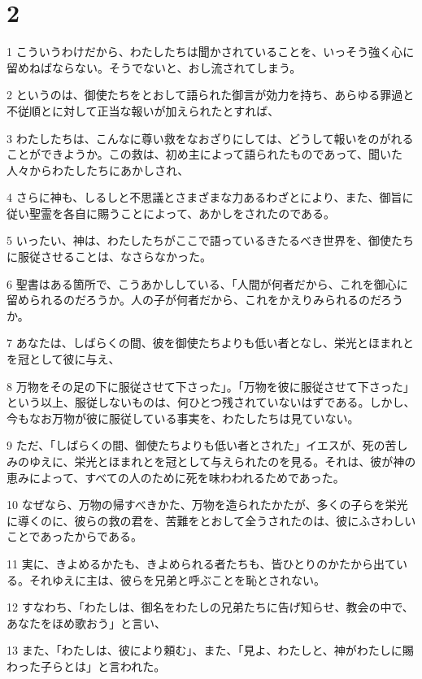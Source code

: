 \chapter{2}

\par 1 こういうわけだから、わたしたちは聞かされていることを、いっそう強く心に留めねばならない。そうでないと、おし流されてしまう。
\par 2 というのは、御使たちをとおして語られた御言が効力を持ち、あらゆる罪過と不従順とに対して正当な報いが加えられたとすれば、
\par 3 わたしたちは、こんなに尊い救をなおざりにしては、どうして報いをのがれることができようか。この救は、初め主によって語られたものであって、聞いた人々からわたしたちにあかしされ、
\par 4 さらに神も、しるしと不思議とさまざまな力あるわざとにより、また、御旨に従い聖霊を各自に賜うことによって、あかしをされたのである。
\par 5 いったい、神は、わたしたちがここで語っているきたるべき世界を、御使たちに服従させることは、なさらなかった。
\par 6 聖書はある箇所で、こうあかししている、「人間が何者だから、これを御心に留められるのだろうか。人の子が何者だから、これをかえりみられるのだろうか。
\par 7 あなたは、しばらくの間、彼を御使たちよりも低い者となし、栄光とほまれとを冠として彼に与え、
\par 8 万物をその足の下に服従させて下さった」。「万物を彼に服従させて下さった」という以上、服従しないものは、何ひとつ残されていないはずである。しかし、今もなお万物が彼に服従している事実を、わたしたちは見ていない。
\par 9 ただ、「しばらくの間、御使たちよりも低い者とされた」イエスが、死の苦しみのゆえに、栄光とほまれとを冠として与えられたのを見る。それは、彼が神の恵みによって、すべての人のために死を味わわれるためであった。
\par 10 なぜなら、万物の帰すべきかた、万物を造られたかたが、多くの子らを栄光に導くのに、彼らの救の君を、苦難をとおして全うされたのは、彼にふさわしいことであったからである。
\par 11 実に、きよめるかたも、きよめられる者たちも、皆ひとりのかたから出ている。それゆえに主は、彼らを兄弟と呼ぶことを恥とされない。
\par 12 すなわち、「わたしは、御名をわたしの兄弟たちに告げ知らせ、教会の中で、あなたをほめ歌おう」と言い、
\par 13 また、「わたしは、彼により頼む」、また、「見よ、わたしと、神がわたしに賜わった子らとは」と言われた。
